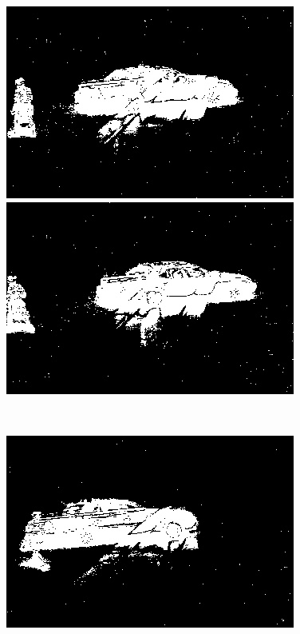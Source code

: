 \documentclass[a4paper]{ctexart}
\begin{document}
\begin{figure}[htbp]
\begin{minipage}[t]{0.2\textwidth}
	\end{minipage}
	\begin{minipage}[t]{0.2\textwidth}
		\centering
		\includegraphics[width=\textwidth]{figure/frames/single_gN20410.jpg}
	\end{minipage}
	\begin{minipage}[t]{0.2\textwidth}
		\centering
		\includegraphics[width=\textwidth]{figure/frames/single_gN20415.jpg}
	\end{minipage}\\
	\begin{minipage}[t]{0.2\textwidth}
		\centering
		\includegraphics[width=\textwidth]{figure/frames/single_gN20T01400.jpg}

\end{minipage}
\end{figure}
\end{document}

